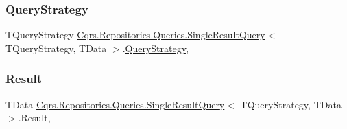 \subsubsection{\texorpdfstring{Query\+Strategy}{QueryStrategy}}
{\footnotesize\ttfamily T\+Query\+Strategy \hyperlink{classCqrs_1_1Repositories_1_1Queries_1_1SingleResultQuery}{Cqrs.\+Repositories.\+Queries.\+Single\+Result\+Query}$<$ T\+Query\+Strategy, T\+Data $>$.\hyperlink{classCqrs_1_1Repositories_1_1Queries_1_1QueryStrategy}{Query\+Strategy}\hspace{0.3cm}{\ttfamily [get]}, {\ttfamily [set]}}

\mbox{\label{classCqrs_1_1Repositories_1_1Queries_1_1SingleResultQuery_a8ec51fe4bb5f1c9f1f62abdf9cf7c370_a8ec51fe4bb5f1c9f1f62abdf9cf7c370}} 
\subsubsection{\texorpdfstring{Result}{Result}}
{\footnotesize\ttfamily T\+Data \hyperlink{classCqrs_1_1Repositories_1_1Queries_1_1SingleResultQuery}{Cqrs.\+Repositories.\+Queries.\+Single\+Result\+Query}$<$ T\+Query\+Strategy, T\+Data $>$.Result\hspace{0.3cm}{\ttfamily [get]}, {\ttfamily [set]}}

